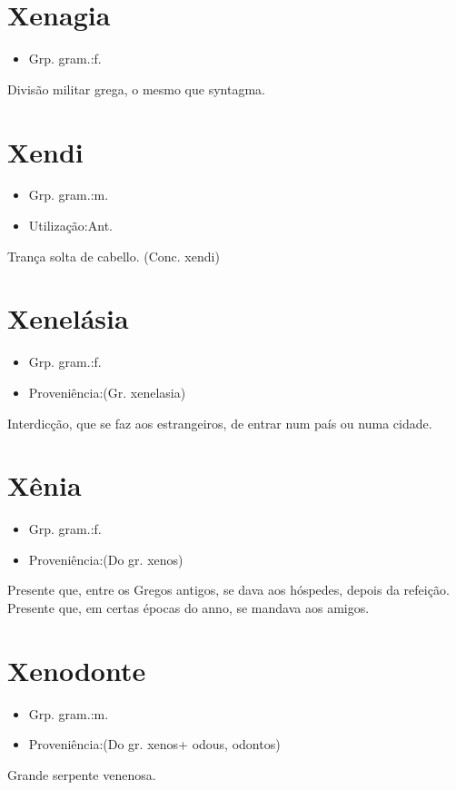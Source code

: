 \section{Xenagia}
\begin{itemize}
\item {Grp. gram.:f.}
\end{itemize}
Divisão militar grega, o mesmo que \textunderscore syntagma\textunderscore .
\section{Xendi}
\begin{itemize}
\item {Grp. gram.:m.}
\end{itemize}
\begin{itemize}
\item {Utilização:Ant.}
\end{itemize}
Trança solta de cabello.
(Conc. \textunderscore xendi\textunderscore )
\section{Xenelásia}
\begin{itemize}
\item {Grp. gram.:f.}
\end{itemize}
\begin{itemize}
\item {Proveniência:(Gr. \textunderscore xenelasia\textunderscore )}
\end{itemize}
Interdicção, que se faz aos estrangeiros, de entrar num país ou numa cidade.
\section{Xênia}
\begin{itemize}
\item {Grp. gram.:f.}
\end{itemize}
\begin{itemize}
\item {Proveniência:(Do gr. \textunderscore xenos\textunderscore )}
\end{itemize}
Presente que, entre os Gregos antigos, se dava aos hóspedes, depois da refeição.
Presente que, em certas épocas do anno, se mandava aos amigos.
\section{Xenodonte}
\begin{itemize}
\item {Grp. gram.:m.}
\end{itemize}
\begin{itemize}
\item {Proveniência:(Do gr. \textunderscore xenos\textunderscore  + \textunderscore odous\textunderscore , \textunderscore odontos\textunderscore )}
\end{itemize}
Grande serpente venenosa.
